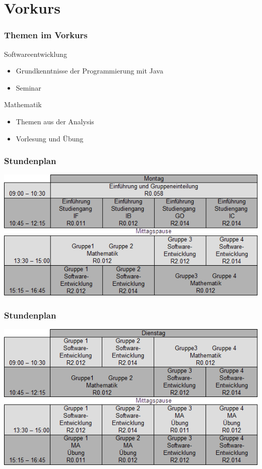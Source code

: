 \documentclass{beamer}
\begin{document}
	\section{Vorkurs}
	
	\begin{frame}
		\frametitle{Themen im Vorkurs}
		Softwareentwicklung
		\begin{itemize}
			\item Grundkenntnisse der Programmierung mit Java
			\item Seminar
		\end{itemize}
		\bigskip
		Mathematik
		\begin{itemize}
			\item Themen aus der Analysis
			\item Vorlesung und Übung
		\end{itemize}
	\end{frame}
	
	\begin{frame}
		\frametitle{Stundenplan}
		\includegraphics[width=1\textwidth]{montag.png}
	\end{frame}
	
	\begin{frame}
		\frametitle{Stundenplan}
		\includegraphics[width=1\textwidth]{dienstag.png}
	\end{frame}
	
\end{document}
